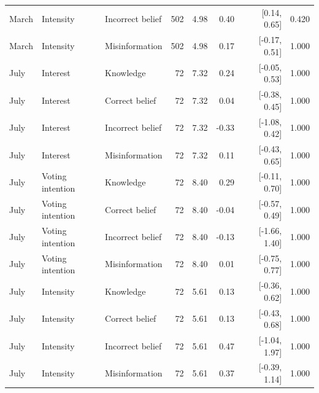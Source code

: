 \begin{longtable}{lllrrrrr}
March & Intensity & Incorrect belief & 502 & 4.98 & 0.40 & [0.14, 0.65] & 0.420 \\
March & Intensity & Misinformation & 502 & 4.98 & 0.17 & [-0.17, 0.51] & 1.000 \\
July & Interest & Knowledge &  72 & 7.32 & 0.24 & [-0.05, 0.53] & 1.000 \\
July & Interest & Correct belief &  72 & 7.32 & 0.04 & [-0.38, 0.45] & 1.000 \\
July & Interest & Incorrect belief &  72 & 7.32 & -0.33 & [-1.08, 0.42] & 1.000 \\
July & Interest & Misinformation &  72 & 7.32 & 0.11 & [-0.43, 0.65] & 1.000 \\
July & Voting intention & Knowledge &  72 & 8.40 & 0.29 & [-0.11, 0.70] & 1.000 \\
July & Voting intention & Correct belief &  72 & 8.40 & -0.04 & [-0.57, 0.49] & 1.000 \\
July & Voting intention & Incorrect belief &  72 & 8.40 & -0.13 & [-1.66, 1.40] & 1.000 \\
July & Voting intention & Misinformation &  72 & 8.40 & 0.01 & [-0.75, 0.77] & 1.000 \\
July & Intensity & Knowledge &  72 & 5.61 & 0.13 & [-0.36, 0.62] & 1.000 \\
July & Intensity & Correct belief &  72 & 5.61 & 0.13 & [-0.43, 0.68] & 1.000 \\
July & Intensity & Incorrect belief &  72 & 5.61 & 0.47 & [-1.04, 1.97] & 1.000 \\
July & Intensity & Misinformation &  72 & 5.61 & 0.37 & [-0.39, 1.14] & 1.000 \\
\end{longtable}
